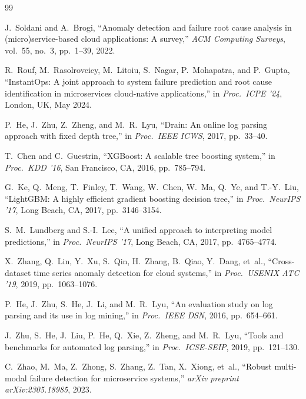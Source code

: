 \documentclass[5p, times]{elsarticle}
\begin{document}
\begin{thebibliography}{99}

J.~Soldani and A.~Brogi, ``Anomaly detection and failure root cause
analysis in (micro)service-based cloud applications: A survey,''
\textit{ACM Computing Surveys}, vol.~55, no.~3, pp.~1--39, 2022.

R.~Rouf, M.~Rasolroveicy, M.~Litoiu, S.~Nagar, P.~Mohapatra, and
P.~Gupta, ``InstantOps: A joint approach to system failure prediction
and root cause identification in microservices cloud-native
applications,'' in \textit{Proc.\ ICPE '24}, London, UK, May 2024.

P.~He, J.~Zhu, Z.~Zheng, and M.~R.~Lyu, ``Drain: An online log
parsing approach with fixed depth tree,'' in \textit{Proc.\ IEEE
ICWS}, 2017, pp.~33--40.

T.~Chen and C.~Guestrin, ``XGBoost: A scalable tree boosting
system,'' in \textit{Proc.\ KDD '16}, San Francisco, CA,
2016, pp.~785--794.

G.~Ke, Q.~Meng, T.~Finley, T.~Wang, W.~Chen, W.~Ma, Q.~Ye, and
T.-Y.~Liu, ``LightGBM: A highly efficient gradient boosting
decision tree,'' in \textit{Proc.\ NeurIPS '17}, Long Beach, CA,
2017, pp.~3146--3154.

S.~M.~Lundberg and S.-I.~Lee, ``A unified approach to interpreting
model predictions,'' in \textit{Proc.\ NeurIPS '17}, Long Beach,
CA, 2017, pp.~4765--4774.

X.~Zhang, Q.~Lin, Y.~Xu, S.~Qin, H.~Zhang, B.~Qiao, Y.~Dang,
et~al., ``Cross-dataset time series anomaly detection for cloud
systems,'' in \textit{Proc.\ USENIX ATC '19}, 2019,
pp.~1063--1076.

P.~He, J.~Zhu, S.~He, J.~Li, and M.~R.~Lyu, ``An evaluation study
on log parsing and its use in log mining,'' in \textit{Proc.\ IEEE
DSN}, 2016, pp.~654--661.

J.~Zhu, S.~He, J.~Liu, P.~He, Q.~Xie, Z.~Zheng, and M.~R.~Lyu,
``Tools and benchmarks for automated log parsing,'' in
\textit{Proc.\ ICSE-SEIP}, 2019, pp.~121--130.

C.~Zhao, M.~Ma, Z.~Zhong, S.~Zhang, Z.~Tan, X.~Xiong, et~al.,
``Robust multi-modal failure detection for microservice systems,''
\textit{arXiv preprint arXiv:2305.18985}, 2023.


\end{thebibliography}
\end{document}
